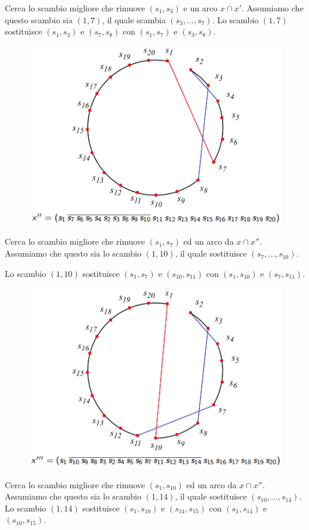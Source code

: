\documentclass{article}
\begin{document}
Cerca lo scambio migliore che rimuove $(s_1,s_3)$ e un arco $x\cap x'$. Assumiamo che
questo scambio sia $(1,7)$, il quale scambia $(s_3,\dots,s_7)$.
Lo scambio $(1,7)$ sostituisce $(s_1,s_3)$ e $(s_7,s_8)$ con $(s_1,s_7)$ e $(s_3,s_8)$.
\begin{figure}[H]
    \centering
    \includegraphics[scale=0.4]{images/exampl_kernig3.png}
\end{figure}
Cerca lo scambio migliore che rimuove $(s_1,s_7)$ ed un arco da $x\cap x''$. Assumiamo
che questo sia lo scambio $(1,10)$, il quale sostituisce $(s_7,\dots,s_{10})$.

Lo scambio $(1,10)$ sostituisce $(s_1,s_7)$ e $(s_{10},s_{11})$ con
$(s_1,s_{10})$ e $(s_7,s_{11})$.

\begin{figure}[H]
    \centering
    \includegraphics[scale=0.4]{images/exampl_kernig4.png}
\end{figure}
Cerca lo scambio migliore che rimuove $(s_1,s_{10})$ ed un arco da $x\cap x''$.
Assumiamo che questo sia lo scambio $(1,14)$, il quale sostituisce $(s_{10},\dots,s_{14})$.
Lo scambio $(1,14)$ sostituisce $(s_1,s_{10})$ e $(s_{14},s_{15})$ con $(s_1,s_{14})$ e
$(s_{10},s_{15})$.
\end{document}
